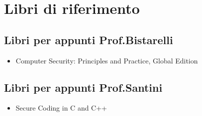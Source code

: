 \thispagestyle{empty} %

\chapter*{Libri di riferimento}
\section*{Libri per appunti Prof.Bistarelli}
\begin{itemize}
    \item Computer Security: Principles and Practice, Global Edition \cite{comp_sec_principles}
\end{itemize}


\section*{Libri per appunti Prof.Santini}
\begin{itemize}
    \item Secure Coding in C and C++ \cite{secure_coding_c}
\end{itemize}
